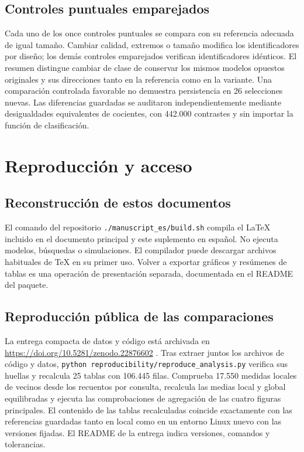 \documentclass[12pt]{article}
\begin{document}
\subsection{Controles puntuales emparejados}
Cada uno de los once controles puntuales se compara con su referencia adecuada de igual tamaño. Cambiar calidad, extremos o tamaño modifica los identificadores por diseño; los demás controles emparejados verifican identificadores idénticos. El resumen distingue cambiar de clase de conservar los mismos modelos opuestos originales y sus direcciones tanto en la referencia como en la variante. Una comparación controlada favorable no demuestra persistencia en 26 selecciones nuevas. Las diferencias guardadas se auditaron independientemente mediante desigualdades equivalentes de cocientes, con 442.000 contrastes y sin importar la función de clasificación.

\FloatBarrier

\section{Reproducción y acceso}

\subsection{Reconstrucción de estos documentos}
El comando del repositorio \nolinkurl{./manuscript_es/build.sh} compila el LaTeX incluido en el documento principal y este suplemento en español. No ejecuta modelos, búsquedas o simulaciones. El compilador puede descargar archivos habituales de TeX en su primer uso. Volver a exportar gráficos y resúmenes de tablas es una operación de presentación separada, documentada en el README del paquete.

\subsection{Reproducción pública de las comparaciones}
La entrega compacta de datos y código está archivada en \url{https://doi.org/10.5281/zenodo.22876602} \citep{treny2026reproduction}. Tras extraer juntos los archivos de código y datos, \texttt{python }\nolinkurl{reproducibility/reproduce_analysis.py} verifica sus huellas y recalcula 25 tablas con 106.445 filas. Comprueba 17.550 medidas locales de vecinos desde los recuentos por consulta, recalcula las medias local y global equilibradas y ejecuta las comprobaciones de agregación de las cuatro figuras principales. El contenido de las tablas recalculadas coincide exactamente con las referencias guardadas tanto en local como en un entorno Linux nuevo con las versiones fijadas. El README de la entrega indica versiones, comandos y tolerancias.
\end{document}
